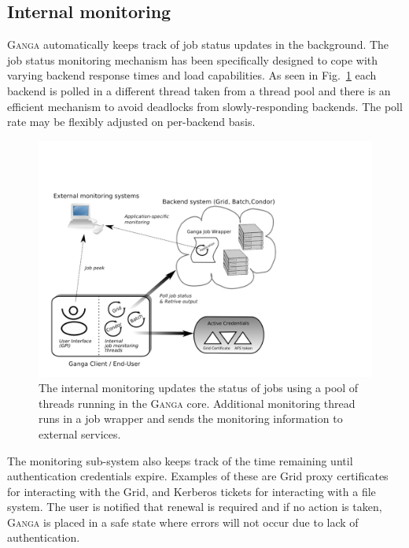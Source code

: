 \documentclass{elsart}
\def\ganga {\textsc{Ganga}\xspace}
\def\grid {Grid\xspace}
\begin{document}
\subsection{Internal monitoring}
\label{sec:GangaMonitoring}
\ganga automatically keeps track of job status updates in the background.  The
job status monitoring mechanism has been specifically designed to cope with
varying backend response times and load capabilities. As seen in
Fig.~\ref{fig:job_status_monitoring_mechanism} each backend is polled in a
different thread taken from a thread pool and there is an efficient mechanism
to avoid deadlocks from slowly-responding backends. The poll rate may be
flexibly adjusted on per-backend basis.
\begin{figure}[htbp]
  \begin{center}
    \includegraphics[width=1 \textwidth]{monitoring}
    \caption{The internal monitoring updates the status of jobs using a pool of threads running in the \ganga core. Additional monitoring thread runs in a job wrapper and sends the monitoring information to external services. }
    \label{fig:job_status_monitoring_mechanism}
  \end{center}
\end{figure}

The monitoring sub-system also keeps track of the time remaining until
authentication credentials expire. Examples of these are \grid proxy certificates
for interacting with the \grid, and Kerberos  tickets for interacting with a
file system. The user is notified that renewal is required and if no action is
taken, \ganga is placed in a safe state where errors will not occur due to
lack of authentication.
\end{document}
